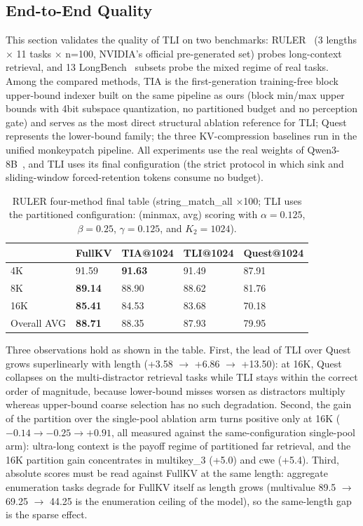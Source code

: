 \documentclass[11pt]{article}
\begin{document}
\subsection{End-to-End Quality}

This section validates the quality of TLI on two benchmarks: RULER~\cite{ruler} (3 lengths $\times$ 11 tasks $\times$ n=100, NVIDIA's official pre-generated set) probes long-context retrieval, and 13 LongBench~\cite{longbench} subsets probe the mixed regime of real tasks. Among the compared methods, TIA is the first-generation training-free block upper-bound indexer built on the same pipeline as ours (block min/max upper bounds with 4bit subspace quantization, no partitioned budget and no perception gate) and serves as the most direct structural ablation reference for TLI; Quest represents the lower-bound family; the three KV-compression baselines run in the unified monkeypatch pipeline. All experiments use the real weights of Qwen3-8B~\cite{qwen3}, and TLI uses its final configuration (the strict protocol in which sink and sliding-window forced-retention tokens consume no budget).

\begin{table}[h]\centering
\caption{RULER four-method final table (string\_match\_all $\times$100; TLI uses the partitioned configuration: (minmax, avg) scoring with $\alpha{=}0.125$, $\beta{=}0.25$, $\gamma{=}0.125$, and $K_2{=}1024$).}
\begin{tabular}{lllll}
\toprule
 & FullKV & TIA@1024 & TLI@1024 & Quest@1024 \\
\midrule
4K & 91.59 & \textbf{91.63} & 91.49 & 87.91 \\
8K & \textbf{89.14} & 88.90 & 88.62 & 81.76 \\
16K & \textbf{85.41} & 84.53 & 83.68 & 70.18 \\
Overall AVG & \textbf{88.71} & 88.35 & 87.93 & 79.95 \\
\bottomrule
\end{tabular}
\end{table}

Three observations hold as shown in the table. First, the lead of TLI over Quest grows superlinearly with length (+3.58 $\rightarrow$ +6.86 $\rightarrow$ +13.50): at 16K, Quest collapses on the multi-distractor retrieval tasks while TLI stays within the correct order of magnitude, because lower-bound misses worsen as distractors multiply whereas upper-bound coarse selection has no such degradation. Second, the gain of the partition over the single-pool ablation arm turns positive only at 16K ($-0.14 \rightarrow -0.25 \rightarrow +0.91$, all measured against the same-configuration single-pool arm): ultra-long context is the payoff regime of partitioned far retrieval, and the 16K partition gain concentrates in multikey\_3 (+5.0) and cwe (+5.4). Third, absolute scores must be read against FullKV at the same length: aggregate enumeration tasks degrade for FullKV itself as length grows (multivalue 89.5 $\rightarrow$ 69.25 $\rightarrow$ 44.25 is the enumeration ceiling of the model), so the same-length gap is the sparse effect.
\end{document}
